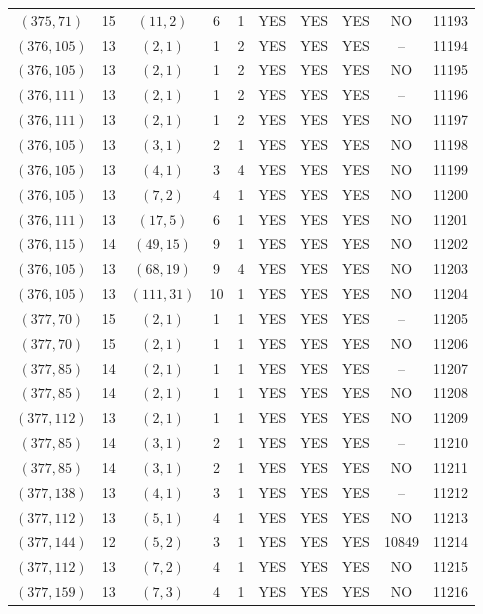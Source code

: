 \begin{longtable}{|c|c|c|c|c|c|c|c|c|c|}
$(375, 71)$ & 15 & $(11, 2)$ & 6 & 1 & YES & YES & YES & NO & 11193\\
$(376, 105)$ & 13 & $(2, 1)$ & 1 & 2 & YES & YES & YES & -- & 11194\\
$(376, 105)$ & 13 & $(2, 1)$ & 1 & 2 & YES & YES & YES & NO & 11195\\
$(376, 111)$ & 13 & $(2, 1)$ & 1 & 2 & YES & YES & YES & -- & 11196\\
$(376, 111)$ & 13 & $(2, 1)$ & 1 & 2 & YES & YES & YES & NO & 11197\\
$(376, 105)$ & 13 & $(3, 1)$ & 2 & 1 & YES & YES & YES & NO & 11198\\
$(376, 105)$ & 13 & $(4, 1)$ & 3 & 4 & YES & YES & YES & NO & 11199\\
$(376, 105)$ & 13 & $(7, 2)$ & 4 & 1 & YES & YES & YES & NO & 11200\\
$(376, 111)$ & 13 & $(17, 5)$ & 6 & 1 & YES & YES & YES & NO & 11201\\
$(376, 115)$ & 14 & $(49, 15)$ & 9 & 1 & YES & YES & YES & NO & 11202\\
$(376, 105)$ & 13 & $(68, 19)$ & 9 & 4 & YES & YES & YES & NO & 11203\\
$(376, 105)$ & 13 & $(111, 31)$ & 10 & 1 & YES & YES & YES & NO & 11204\\
$(377, 70)$ & 15 & $(2, 1)$ & 1 & 1 & YES & YES & YES & -- & 11205\\
$(377, 70)$ & 15 & $(2, 1)$ & 1 & 1 & YES & YES & YES & NO & 11206\\
$(377, 85)$ & 14 & $(2, 1)$ & 1 & 1 & YES & YES & YES & -- & 11207\\
$(377, 85)$ & 14 & $(2, 1)$ & 1 & 1 & YES & YES & YES & NO & 11208\\
$(377, 112)$ & 13 & $(2, 1)$ & 1 & 1 & YES & YES & YES & NO & 11209\\
$(377, 85)$ & 14 & $(3, 1)$ & 2 & 1 & YES & YES & YES & -- & 11210\\
$(377, 85)$ & 14 & $(3, 1)$ & 2 & 1 & YES & YES & YES & NO & 11211\\
$(377, 138)$ & 13 & $(4, 1)$ & 3 & 1 & YES & YES & YES & -- & 11212\\
$(377, 112)$ & 13 & $(5, 1)$ & 4 & 1 & YES & YES & YES & NO & 11213\\
$(377, 144)$ & 12 & $(5, 2)$ & 3 & 1 & YES & YES & YES & 10849 & 11214\\
$(377, 112)$ & 13 & $(7, 2)$ & 4 & 1 & YES & YES & YES & NO & 11215\\
$(377, 159)$ & 13 & $(7, 3)$ & 4 & 1 & YES & YES & YES & NO & 11216\\

\end{longtable}
